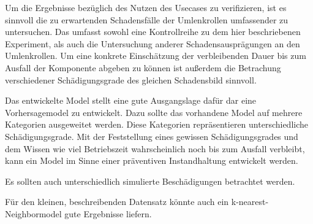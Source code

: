 Um die Ergebnisse bezüglich des Nutzen des Usecases zu verifizieren, ist es sinnvoll die zu erwartenden Schadensfälle der Umlenkrollen umfassender zu untersuchen. Das umfasst sowohl eine Kontrollreihe zu dem hier beschriebenen Experiment, als auch die Untersuchung anderer Schadensausprägungen an den Umlenkrollen. Um eine konkrete Einschätzung der verbleibenden Dauer bis zum Ausfall der Komponente abgeben zu können ist außerdem die Betrachung verschiedener Schädigungsgrade des gleichen Schadensbild sinnvoll. 

Das entwickelte Model stellt eine gute Ausgangslage dafür dar eine Vorhersagemodel zu entwickelt. Dazu sollte das vorhandene Model auf mehrere Kategorien ausgeweitet werden. Diese Kategorien repräsentieren unterschiedliche Schädigungsgrade. Mit der Feststellung eines gewissen Schädigungsgrades und dem Wissen wie viel Betriebszeit wahrscheinlich noch bis zum Ausfall verbleibt, kann ein Model im Sinne einer präventiven Instandhaltung entwickelt werden.

Es sollten auch unterschiedlich simulierte Beschädigungen betrachtet werden.

Für den kleinen, beschreibenden Datensatz könnte auch ein k-nearest-Neighbormodel gute Ergebnisse liefern.
